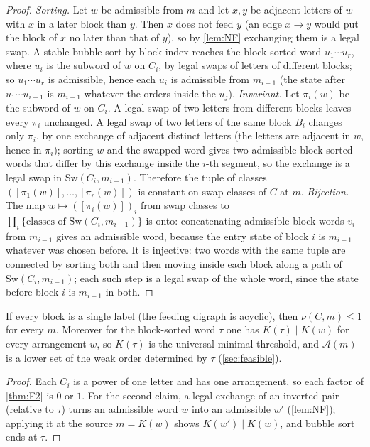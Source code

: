 \begin{proof}
\emph{Sorting.} Let $w$ be admissible from $m$ and let $x,y$ be adjacent letters of $w$ with $x$ in a later block than $y$. Then $x$ does not feed $y$ (an edge $x\to y$ would put the block of $x$ no later than that of $y$), so by \cref{lem:NF} exchanging them is a legal swap. A stable bubble sort by block index reaches the block-sorted word $u_1\cdots u_r$, where $u_i$ is the subword of $w$ on $C_i$, by legal swaps of letters of different blocks; so $u_1\cdots u_r$ is admissible, hence each $u_i$ is admissible from $m_{i-1}$ (the state after $u_1\cdots u_{i-1}$ is $m_{i-1}$ whatever the orders inside the $u_j$).
\emph{Invariant.} Let $\pi_i(w)$ be the subword of $w$ on $C_i$. A legal swap of two letters from different blocks leaves every $\pi_i$ unchanged. A legal swap of two letters of the same block $B_i$ changes only $\pi_i$, by one exchange of adjacent distinct letters (the letters are adjacent in $w$, hence in $\pi_i$); sorting $w$ and the swapped word gives two admissible block-sorted words that differ by this exchange inside the $i$-th segment, so the exchange is a legal swap in $\mathrm{Sw}(C_i,m_{i-1})$. Therefore the tuple of classes $([\pi_1(w)],\dots,[\pi_r(w)])$ is constant on swap classes of $C$ at $m$.
\emph{Bijection.} The map $w\mapsto([\pi_i(w)])_i$ from swap classes to $\prod_i\{\text{classes of }\mathrm{Sw}(C_i,m_{i-1})\}$ is onto: concatenating admissible block words $v_i$ from $m_{i-1}$ gives an admissible word, because the entry state of block $i$ is $m_{i-1}$ whatever was chosen before. It is injective: two words with the same tuple are connected by sorting both and then moving inside each block along a path of $\mathrm{Sw}(C_i,m_{i-1})$; each such step is a legal swap of the whole word, since the state before block $i$ is $m_{i-1}$ in both.
\end{proof}
\begin{corollary}\label{cor:F1}
If every block is a single label (the feeding digraph is acyclic), then $\nu(C,m)\le1$ for every $m$. Moreover for the block-sorted word $\tau$ one has $K(\tau)\mid K(w)$ for every arrangement $w$, so $K(\tau)$ is the universal minimal threshold, and $\mathcal A(m)$ is a lower set of the weak order determined by $\tau$ (\cref{sec:feasible}).
\end{corollary}
\begin{proof}
Each $C_i$ is a power of one letter and has one arrangement, so each factor of \cref{thm:F2} is $0$ or $1$. For the second claim, a legal exchange of an inverted pair (relative to $\tau$) turns an admissible word $w$ into an admissible $w'$ (\cref{lem:NF}); applying it at the source $m=K(w)$ shows $K(w')\mid K(w)$, and bubble sort ends at $\tau$.
\end{proof}
